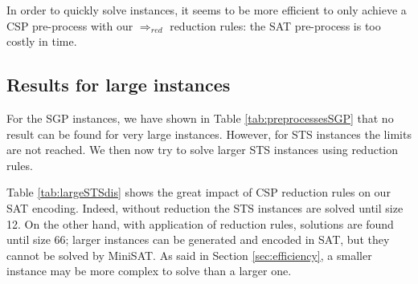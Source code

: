 \documentclass[3p,authoryear,times]{elsarticle}
\newcommand{\rmin}[0]{{\Rightarrow_{red}}}
\begin{document}
\medskip
In order to quickly solve instances, it seems to be more efficient to only achieve a CSP pre-process with our $\rmin$ reduction rules: the SAT pre-process is too costly in time.

\subsection{Results for large instances}

For the SGP instances, we have shown in Table \ref{tab:preprocessesSGP} that no result can be found for very large instances. However, for STS instances the limits are not reached. We then now try to solve larger STS instances using reduction rules.

Table \ref{tab:largeSTSdis} shows the great impact of CSP reduction rules on our SAT encoding. Indeed, without reduction the STS instances are solved until size 12. On the other hand, with application of reduction rules, solutions are found until size 66; larger instances can be generated and encoded in SAT, but they cannot be solved by MiniSAT. As said in Section \ref{sec:efficiency}, a smaller instance may be more complex to solve than a larger one.
\end{document}
